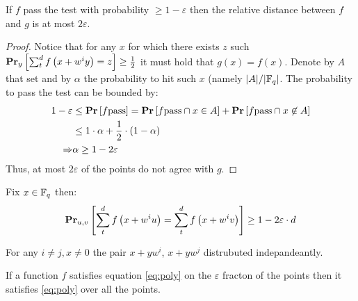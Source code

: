 \begin{claim}
  If $f$ pass the test with probability $\ge 1 - \varepsilon$ then the relative distance between $f$ and $g$ is at most $2\varepsilon$.
\end{claim}

\begin{proof}
  Notice that for any $x$ for  which there exists $z$ such $\prbm{ \sum_{t}^{d}{f\left( x + w^{i}y \right) = z }}{y} \ge \frac{1}{2}$ it must hold that $g(x) = f(x)$. Denote by $A$ that set and by $\alpha$ the probability to hit such $x$ (namely $|A| / |\FF|$. The probability to pass the test can be bounded by:  
  \begin{equation*}
    \begin{split}
      1- \varepsilon & \le \prb{ f \text{pass}} = \prb{ f \text{pass} \cap x \in A } + \prb{ f \text{pass} \cap x \not\in A} \\
      & \le 1 \cdot \alpha + \frac{1}{2} \cdot \left( 1 -\alpha \right) \\
      \Rightarrow & \alpha \ge 1 - 2\varepsilon 
    \end{split}
  \end{equation*}
  Thus, at most $2\varepsilon$ of the points do not agree with $g$. 
\end{proof}

\begin{claim}
Fix $x \in \FF$ then: 
\begin{equation*}
  \begin{split}
    \prbm{  \sum_{t}^{d}{f\left( x + w^{i}u \right)} = \sum_{t}^{d}{f\left( x + w^{i}v \right)} }{ u,v} \ge 1 - 2\varepsilon \cdot d
  \end{split}
\end{equation*}
\end{claim}

\begin{claim}
For any $i\neq j,x \neq 0 $ the pair $x + yw^{i}$, $x+ yw^{j}$ distrubuted indepandeantly.
\end{claim}

\begin{claim}
  If a function $f$ satisfies equation \cref{eq:poly} on the $\varepsilon$ fracton of the points then it satisfies \cref{eq:poly} over all the points.
\end{claim}

